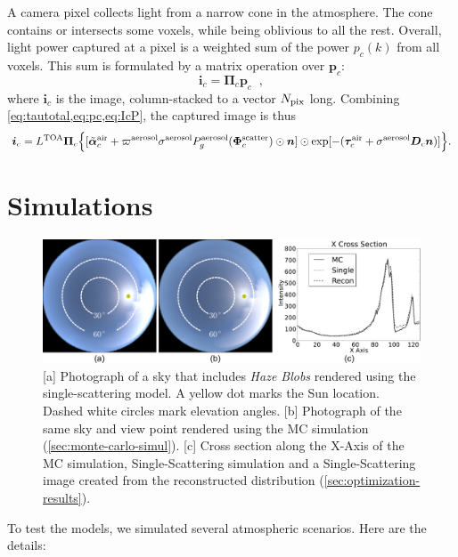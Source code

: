 \documentclass[10pt,letterpaper]{article}
\newcommand{\vect}[1]{\bm{#1}}
\newcommand{\yoavcomment}[1]{}
\renewcommand{\yoavcomment}[1]{#1} %
\begin{document}
A camera pixel collects light from a narrow cone in the
atmosphere. The cone contains or intersects some voxels, while being
oblivious to all the rest.  Overall, light power captured at a pixel
is a weighted sum of the power $p_c(k)$ from all voxels.  This sum is
formulated by a matrix operation over ${\bm p}_c$:
\begin{equation}
  {\bm i}_c= {\vect{\Pi}}_c{\bm p}_c
  \;\;,
  \label{eq:IcP}
\end{equation}
where ${\bm i}_c$ is the image, column-stacked to a vector $N_{\rm
  pix}$ long.  Combining \cref{eq:tautotal,eq:pc,eq:IcP}, the captured
image is thus
\begin{align}
  {\bm i}_c= L^{\rm TOA} {\vect{\Pi}}_c \Big\{
  [\tilde{\vect{\alpha}}^{\rm air}_c + \varpi^{\rm aerosol}\sigma^{\rm
    aerosol} P^{\rm aerosol}_g(\vect{\Phi}^{\rm scatter}_c) \odot{\bm
    n} ] \odot \exp[-(\vect{\tau}_c^{\rm air} + {\sigma}^{\rm aerosol}
  {\bm D}_c{\bm n})] \Big\} .
  \label{eq:bigIA}
\end{align}


\section{Simulations}
\label{sec:simul}

\begin{figure}
  \centering
  \yoavcomment{\includegraphics[width=\linewidth]{images/ref_images.pdf}}
  \caption{\small [a] Photograph of a sky that includes {\em Haze
      Blobs} rendered using the single-scattering model.  A yellow dot
    marks the Sun location. Dashed white circles mark elevation
    angles.  [b] Photograph of the same sky and view point rendered
    using the MC simulation (\cref{sec:monte-carlo-simul}).  [c] Cross
    section along the X-Axis of the MC simulation, Single-Scattering
    simulation and a Single-Scattering image created from the
    reconstructed distribution (\cref{sec:optimization-results}).}
  \label{fig:simulation-results1}
\end{figure}
To test the models, we simulated several atmospheric scenarios. Here
are the details:
\\
\end{document}
